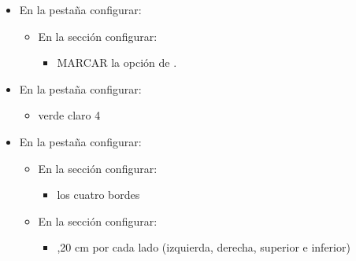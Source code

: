 \documentclass[letterpaper,10pt,spanish]{sphinxmanual}
\begin{document}
\begin{enumerate}
\begin{itemize}
\begin{itemize}
\item {} 
\sphinxAtStartPar
{} 28 pt

\item {} 
\sphinxAtStartPar
{} Negrita

\end{itemize}

\item {} 
\sphinxAtStartPar
En la pestaña  configurar:
\begin{itemize}
\item {} 
\sphinxAtStartPar
En la sección  configurar:
\begin{itemize}
\item {} 
\sphinxAtStartPar
MARCAR la opción de .

\end{itemize}

\end{itemize}

\item {} 
\sphinxAtStartPar
En la pestaña  configurar:
\begin{itemize}
\item {} 
\sphinxAtStartPar
{} verde claro 4

\end{itemize}

\item {} 
\sphinxAtStartPar
En la pestaña  configurar:
\begin{itemize}
\item {} 
\sphinxAtStartPar
En la sección  configurar:
\begin{itemize}
\item {} 
\sphinxAtStartPar
{} los cuatro bordes

\end{itemize}

\item {} 
\sphinxAtStartPar
En la sección  configurar:
\begin{itemize}
\item {} 
,20 cm por cada lado (izquierda, derecha, superior e inferior)

\end{itemize}

\end{itemize}


\end{itemize}
\end{enumerate}
\end{document}

